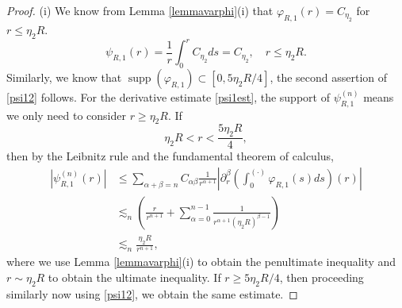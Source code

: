 \documentclass[reqno,11pt]{amsart}
\theoremstyle{plain}
\theoremstyle{definition}
\numberwithin{equation}{section}
\numberwithin{theorem}{section}
\def\geq{\geqslant}
\def\leq{\leqslant}
\begin{document}
\begin{proof}
(i) We know from Lemma \ref{lemmavarphi}(i) that $\varphi_{R, 1}(r)=C_{\eta_{2}}$ for $r \leq \eta_{2} R$. 
\begin{equation*}
\psi_{R,  1}(r)=\frac{1}{r} \int_{0}^{r } C_{\eta_{2}} d s=C_{\eta_{2}}, \quad r \leq \eta_{2}R.
\end{equation*}
Similarly, we know that $\operatorname{supp}\left(\varphi_{R, 1}\right) \subset\left[0,5 \eta_{2} R / 4\right]$,
the second assertion of \eqref{psi12} follows. For the derivative estimate \eqref{psi1est}, the support of $\psi_{R, 1}^{(n)}$ means we only need to consider $r \geq \eta_{2} R$. If
$$\eta_{2} R <r<\frac{5 \eta_{2} R}{4},$$
then by the Leibnitz rule and the fundamental theorem of calculus,
\begin{align*}
\left| \psi_{R,  1}^{(n)}(r)\right| & \leq \sum_{\alpha+\beta=n} C_{\alpha \beta} \frac{1}{r^{\alpha+1}}\left|\partial_{r}^{\beta}\left(\int_{0}^{(\cdot) } \varphi_{R, 1}(s) d s\right)(r)\right| \\
& \lesssim_{n} \left(\frac{r }{r^{n+1}}+\sum_{\alpha=0}^{n-1} \frac{1}{r^{\alpha+1}\left(\eta_{2} R\right)^{\beta-1}}\right) \\
& \lesssim_{n} \frac{\eta_{2} R}{r^{n+1} }, 
\end{align*}
where we use Lemma \ref{lemmavarphi}(i) to obtain the penultimate inequality and $r \sim \eta_{2} R$ to obtain the ultimate inequality. If $r \geq 5 \eta_{2} R/4$, then proceeding similarly now using \eqref{psi12}, we obtain the same estimate. 


\end{proof}
\end{document}
